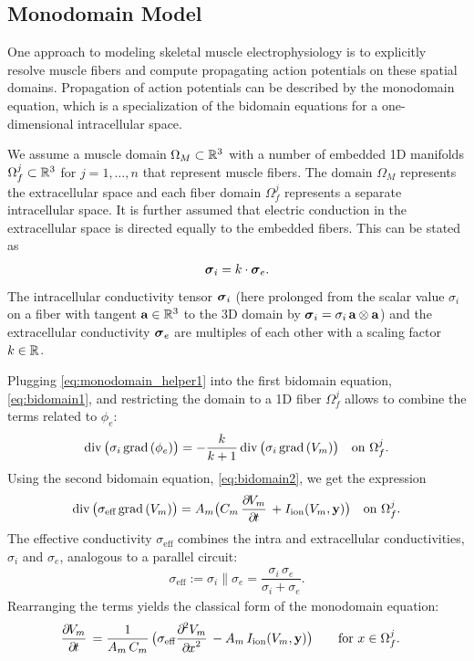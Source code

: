 \subsection{Monodomain Model}\label{sec:monodomain_model}
One approach to modeling skeletal muscle electrophysiology is to explicitly resolve muscle fibers and compute propagating action potentials on these spatial domains.
Propagation of action potentials can be described by the monodomain equation, which is a specialization of the bidomain equations for a one-dimensional intracellular space.

We assume a muscle domain $\Omega_M \subset \mathbb{R}^3$ with a number of embedded 1D manifolds $\Omega_f^j\subset \mathbb{R}^3$ for $j=1,\dots,n$ that represent muscle fibers. The domain $\Omega_M$ represents the extracellular space and each fiber domain $\Omega_f^j$ represents a separate  intracellular space.
It is further assumed that electric conduction in the extracellular space is directed equally to the embedded fibers. This can be stated as%
\begin{align}\label{eq:monodomain_helper1}
  \boldsymbol{\sigma}_i = k\cdot \boldsymbol{\sigma}_e.  
\end{align}
%
The intracellular conductivity tensor $\boldsymbol{\sigma}_i$ (here prolonged from the scalar value $\sigma_i$ on a fiber with tangent $\textbf{a} \in \mathbb{R}^3$ to the 3D domain by $\boldsymbol{\sigma}_i = \sigma_i \, \textbf{a} \otimes \textbf{a}$) and the extracellular conductivity $\boldsymbol{\sigma}_e$ are multiples of each other with a scaling factor $k\in\mathbb{R}$.

Plugging \cref{eq:monodomain_helper1} into the first bidomain equation, \cref{eq:bidomain1}, and restricting the domain to a 1D fiber $\Omega_f^j$ allows to combine the terms related to $\phi_e$:
%
\begin{align*}
  \hbox{div} \,\big(\sigma_i\,\hbox{grad} \,(\phi_e)\big) = -\displaystyle\frac{\displaystyle{k}}{\displaystyle{k+1}}\, \hbox{div} \,\big(\sigma_i\,\hbox{grad} \,(V_m)\big) \quad \text{on }\Omega_f^j.
\end{align*}
% 
Using the second bidomain equation, \cref{eq:bidomain2}, we get the expression
%
\begin{align*}
  \div\big(\sigma_\text{eff} \,\grad(V_m)\big) = A_m\big(C_m\,\p{V_m}{t} + I_\text{ion}(V_m,\bfy)\big) \quad \text{on }\Omega_f^j.
\end{align*}
%
The effective conductivity $\sigma_\text{eff}$ combines the intra and extracellular conductivities, $\sigma_i$ and $\sigma_e$, analogous to a parallel circuit:
\begin{align*}
  \sigma_\text{eff} := \sigma_i \parallel \sigma_e = \dfrac{\sigma_i\,\sigma_e}{\sigma_i + \sigma_e}.
\end{align*}
%
Rearranging the terms yields the classical form of the monodomain equation:
%
\begin{align} %
  &\dfrac{\partial V_m}{\partial t} = \dfrac{1}{A_m\,C_m}\big(\sigma_\text{eff}\dfrac{\partial^2 V_m}{\partial x^2} - A_m\,I_\text{ion}(V_m,\bfy)\big) \quad && \text{for }x \in \Omega_f^j. \label{eq:monodomain}
\end{align}
%

